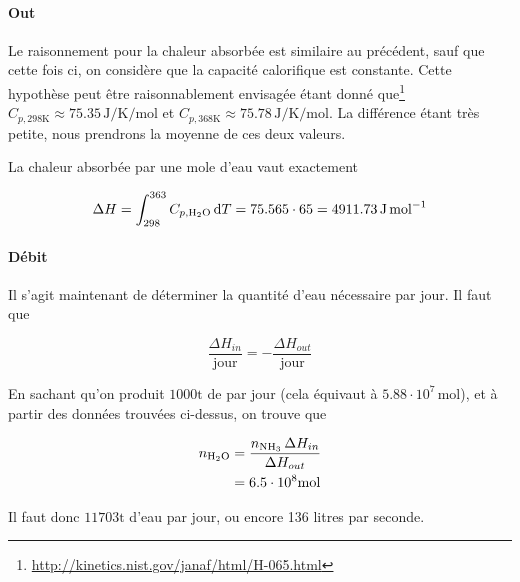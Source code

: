 \documentclass[a4paper, oneside, 12pt]{article}
\begin{document}
\paragraph{Out}

Le raisonnement pour la chaleur absorbée est similaire 
au précédent, sauf que cette fois ci, 
on considère que la capacité calorifique est constante.
Cette hypothèse peut être raisonnablement envisagée 
étant donné que\footnote{\url{http://kinetics.nist.gov/janaf/html/H-065.html}} 
$C_{p, 298 \si{\kelvin}} \approx 75.35 \, \si{\joule\per\kelvin\per\mole}$ 
et $C_{p, 368 \si{\kelvin}} \approx 75.78 \, \si{\joule\per\kelvin\per\mole}$.
La différence étant très petite, 
nous prendrons la moyenne de ces deux valeurs. 

La chaleur absorbée par une mole d'eau vaut exactement

\begin{equation}
	\Delta H = \int_{298}^{363} C_{p, \ce{H2O}} \, \mathrm{d}T
	= 75.565 \cdot 65 = 4911.73 \, \si{\joule\per\mole}
\end{equation}

\paragraph{Débit}

Il s'agit maintenant de déterminer la quantité d'eau nécessaire par jour.
Il faut que

\[
	\frac{\Delta H_{in}}{\mathrm{jour}} 
	= - \frac{\Delta H_{out}}{\mathrm{jour}}
\]

En sachant qu'on produit $1000 \si{\tonne}$ de  par jour
(cela équivaut à $5.88 \cdot 10^7 \, \si{\mole}$),
et à partir des données trouvées ci-dessus, 
on trouve que

\begin{align*}
	n_{\ce{H2O}} &= \frac{n_{\ce{NH3}} \, \Delta H_{in}}{\Delta H_{out}} \\
	&= 6.5 \cdot 10^8 \si{\mole} 
\end{align*}

Il faut donc $11703 \si{\tonne}$ d'eau par jour, 
ou encore 136 litres par seconde.
\end{document}
